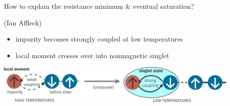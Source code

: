 \documentclass[aspectratio=169]{beamer}
\begin{document}
\begin{frame}{How to explain the resistance minimum \& eventual saturation?}
\begin{minipage}{0.2\textwidth}
\footnotesize{(Ian Affleck)}
\end{minipage}
\begin{minipage}{0.38\textwidth}
\begin{itemize}
	\item impurity becomes \alert{strongly coupled} at low temperatures
	\item local moment crosses over into \alert{nonmagnetic} singlet
\end{itemize}
\end{minipage}

\vspace*{\fill}
\includegraphics[width=0.9\textwidth]{crossover.pdf}\\

\end{frame}
\end{document}
